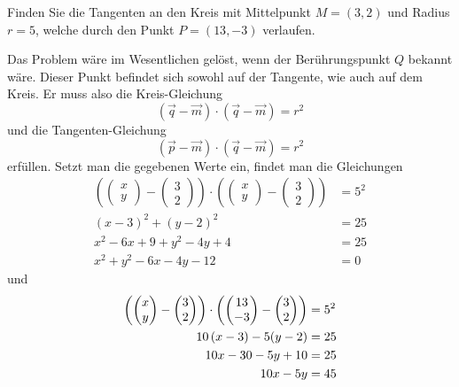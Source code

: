 Finden Sie die Tangenten an den Kreis mit Mittelpunkt $M=(3,2)$ und
Radius $r=5$, welche durch den Punkt $P=(13,-3)$ verlaufen.


\begin{loesung}
Das Problem wäre im Wesentlichen gelöst, wenn der Berührungspunkt $Q$ 
bekannt wäre. Dieser Punkt befindet sich sowohl auf der
Tangente, wie auch auf dem Kreis. Er muss also die Kreis-Gleichung
\[
  (\vec q- \vec m)\cdot(\vec q- \vec m) = r^2
\]
und die Tangenten-Gleichung
\[
  (\vec p- \vec m)\cdot(\vec q- \vec m) = r^2
\]
erfüllen.
Setzt man die gegebenen Werte ein, findet man die Gleichungen
\begin{align*}
 \left(\begin{pmatrix}x\\y\end{pmatrix}- \begin{pmatrix}3\\2\end{pmatrix}\right)\cdot
 \left(\begin{pmatrix}x\\y\end{pmatrix}- \begin{pmatrix}3\\2\end{pmatrix}\right) &= 5^2\\
  (x-3)^2 + (y-2)^2&= 25\\
  x^2-6x + 9 + y^2 -4y +4 &= 25\\
  x^2 + y^2 -6x -4y - 12 &= 0
\end{align*}
und 
\begin{align}
 \left(\begin{pmatrix}x\\y\end{pmatrix}- \begin{pmatrix}3\\2\end{pmatrix}\right)\cdot
 \left(\begin{pmatrix}13\\-3\end{pmatrix}- \begin{pmatrix}3\\2\end{pmatrix}\right) &= 5^2\notag\\
  10\,(x-3) -5 (y-2)&= 25\notag\\
  10x -30 -5y +10 &= 25\notag\\
  10x -5y &= 45\notag\\

\end{align}
\end{loesung}
